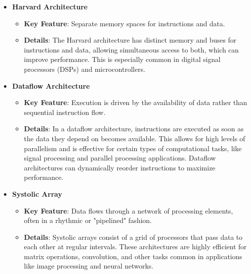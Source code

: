 \documentclass{article}
\begin{document}
\begin{itemize}
    \item{\textbf{Harvard Architecture}}
    \begin{itemize}
        \item{\textbf{Key Feature}}: Separate memory spaces for instructions and data.
        \item{\textbf{Details}}: The Harvard architecture has distinct memory and buses for instructions and data, allowing simultaneous access to both, which can improve performance. This is especially common in digital signal processors (DSPs) and microcontrollers.
    \end{itemize}
    
    \item{\textbf{Dataflow Architecture}}
    \begin{itemize}
        \item{\textbf{Key Feature}}: Execution is driven by the availability of data rather than sequential instruction flow.
        \item{\textbf{Details}}: In a dataflow architecture, instructions are executed as soon as the data they depend on becomes available. This allows for high levels of parallelism and is effective for certain types of computational tasks, like signal processing and parallel processing applications. Dataflow architectures can dynamically reorder instructions to maximize performance.
    \end{itemize}

    \item{\textbf{Systolic Array}}
    \begin{itemize}
        \item{\textbf{Key Feature}}: Data flows through a network of processing elements, often in a rhythmic or "pipelined" fashion.
        \item{\textbf{Details}}: Systolic arrays consist of a grid of processors that pass data to each other at regular intervals. These architectures are highly efficient for matrix operations, convolution, and other tasks common in applications like image processing and neural networks.
    \end{itemize}


\end{itemize}
\end{document}
